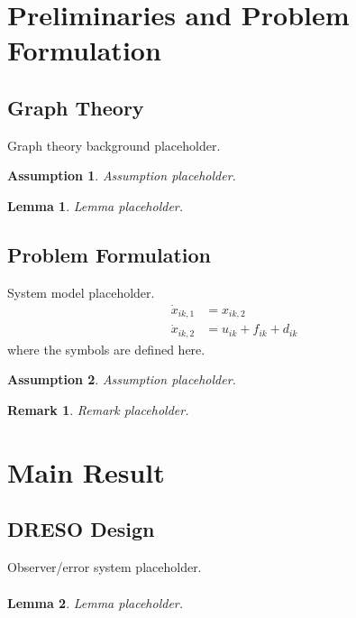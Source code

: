 \documentclass[lettersize,journal]{IEEEtran}
\newtheorem{lemma}{Lemma}
\newtheorem{assumption}{Assumption}
\newtheorem{remark}{Remark}
\begin{document}
\section{Preliminaries and Problem Formulation}

\subsection{Graph Theory}
Graph theory background placeholder.\begin{assumption}Assumption placeholder.\end{assumption}
\begin{lemma}Lemma placeholder.\end{lemma}

\subsection{Problem Formulation}
System model placeholder.
\begin{align}
\dot{x}_{ik,1} &= x_{ik,2} \nonumber\\
\dot{x}_{ik,2} &= u_{ik}+f_{ik}+d_{ik}
\label{eq:system}
\end{align}
where the symbols are defined here.

\begin{assumption}Assumption placeholder.\end{assumption}
\begin{remark}Remark placeholder.\end{remark}

\section{Main Result}

{\subsection{DRESO Design}}
Observer/error system placeholder.
\begin{align}
\label{eq:observer}
\end{align}
\begin{lemma}Lemma placeholder.\end{lemma}
\end{document}
